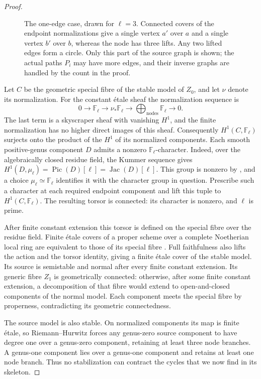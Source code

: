 \begin{proof}
\begin{figure}[htb]
\centering

\caption{The one-edge case, drawn for $\ell=3$. Connected covers of
the endpoint normalizations give a single vertex $a'$ over $a$ and a
single vertex $b'$ over $b$, whereas the node has three lifts. Any two lifted edges
form a circle. Only this part of the source graph is shown; the actual
paths $P_i$ may have more edges, and their inverse graphs are handled
by the count in the proof.}
\label{fig:path-cycle}
\end{figure}

Let $C$ be the geometric special fibre of the stable model of $Z_0$,
and let $\nu$ denote its normalization. For the constant \'etale
sheaf the normalization sequence is
\[
 0\longrightarrow\mathbb F_\ell\longrightarrow
 \nu_*\mathbb F_\ell\longrightarrow
 \bigoplus_{\text{nodes}}\mathbb F_\ell\longrightarrow0.
\]
The last term is a skyscraper sheaf with vanishing $H^1$, and the
finite normalization has no higher direct images of this sheaf.
Consequently $H^1(C,\mathbb F_\ell)$ surjects onto the product of
the $H^1$ of its normalized components. Each smooth positive-genus
component $D$ admits a nonzero $\mathbb F_\ell$-character. Indeed,
over the algebraically closed residue field, the Kummer sequence gives
$H^1(D,\mu_\ell)=\operatorname{Pic}(D)[\ell]
=\operatorname{Jac}(D)[\ell]$. This group is nonzero by
\cite[Theorem~8.2 and Remark~8.4]{MilneAV}, and a choice
$\mu_\ell\simeq\mathbb F_\ell$ identifies it with the character
group in question. Prescribe such a character at each required
endpoint component and lift this tuple to $H^1(C,\mathbb F_\ell)$.
The resulting torsor is connected: its character is nonzero, and
$\ell$ is prime.

After finite constant extension this torsor is defined on the special
fibre over the residue field. Finite \'etale covers of a proper scheme
over a complete Noetherian local ring are equivalent to those of its
special fibre \cite[Expos\'e~IX, Th\'eor\`eme~1.10]{SGA1}.
Full faithfulness also lifts the action and the torsor identity, giving
a finite \'etale cover of the stable model. Its source is semistable
and normal after every finite constant extension. Its generic fibre
$Z_1$ is geometrically connected: otherwise, after some finite constant
extension, a decomposition of that fibre would extend to open-and-closed
components of the normal model. Each component meets the special fibre
by properness, contradicting its geometric connectedness.

The source model is also stable. On normalized components its map is
finite \'etale, so Riemann--Hurwitz forces any genus-zero source
component to have degree one over a genus-zero component, retaining
at least three node branches. A genus-one component lies over a
genus-one component and retains at least one node branch. Thus no
stabilization can contract the cycles that we now find in its skeleton.


\end{proof}
